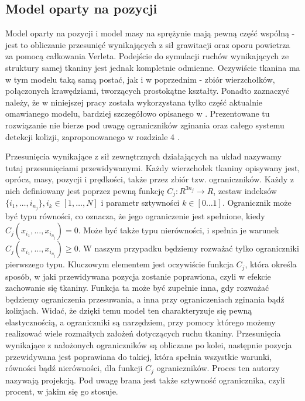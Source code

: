 		\subsection{Model oparty na pozycji}
		\label{t:teoria:analiza:poz}
		
			Model oparty na pozycji i model masy na sprężynie mają pewną część wspólną - jest to obliczanie przesunięć wynikających z sił grawitacji oraz oporu powietrza za pomocą całkowania Verleta. Podejście do symulacji ruchów wynikających ze struktury samej tkaniny jest jednak kompletnie odmienne. Oczywiście tkanina ma w tym modelu taką samą postać, jak i w poprzednim - zbiór wierzchołków, połączonych krawędziami, tworzących prostokątne kształty. Ponadto zaznaczyć należy, że w niniejszej pracy została wykorzystana tylko część aktualnie omawianego modelu, bardziej szczegółowo opisanego w \cite{posbased}. Prezentowane tu rozwiązanie nie bierze pod uwagę ograniczników zginania oraz całego systemu detekcji kolizji, zaproponowanego w rozdziale 4 \cite{posbased}.
			
			Przesunięcia wynikające z sił zewnętrznych działających na układ nazywamy tutaj przesunięciami przewidywanymi. Każdy wierzchołek tkaniny opisywany jest, oprócz, masy, pozycji i prędkości, także przez zbiór tzw. ograniczników. Każdy z nich definiowany jest poprzez pewną funkcję \(C_{j} : R^{3n_{j}} \rightarrow R\), zestaw indeksów \(\{ i_{1}, \dots, i_{n_{j}}  \}, i_{k} \in [1, \dots, N] \) i parametr sztywności \(k \in [0\dots1] \). Ogranicznik może być typu równości, co oznacza, że jego ograniczenie jest spełnione, kiedy \( C_{j}(x_{i_{1}}, \dots, x_{i_{n_{j}}} ) = 0 \). Może być także typu nierówności, i spełnia je warunek \( C_{j}(x_{i_{1}}, \dots, x_{i_{n_{j}}} ) \geq 0 \). W naszym przypadku będziemy rozważać tylko ograniczniki pierwszego typu. Kluczowym elementem jest oczywiście funkcja \(C_{j}\), która określa sposób, w jaki przewidywana pozycja zostanie poprawiona, czyli w efekcie zachowanie się tkaniny. Funkcja ta może być zupełnie inna, gdy rozważać będziemy ograniczenia przesuwania, a inna przy ograniczeniach zginania bądź kolizjach. Widać, że dzięki temu model ten charakteryzuje się pewną elastycznością, a ograniczniki są narzędziem, przy pomocy którego możemy realizować wiele rozmaitych założeń dotyczących ruchu tkaniny. Przesunięcia wynikające z nałożonych ograniczników są obliczane po kolei, następnie pozycja przewidywana jest poprawiana do takiej, która spełnia wszystkie warunki, równości bądź nierówności, dla funkcji \(C_{j}\) ograniczników. Proces ten autorzy \cite{posbased} nazywają projekcją. Pod uwagę brana jest także sztywność ogranicznika, czyli procent, w jakim się go stosuje.
			
